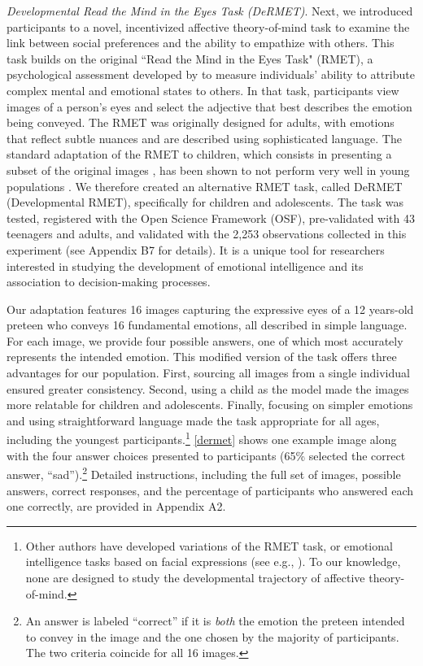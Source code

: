 \documentclass[11pt]{article}
\begin{document}
\emph{Developmental Read the Mind in the Eyes Task (DeRMET)}. Next, we introduced participants to a novel, incentivized affective theory-of-mind task to examine the link between social preferences and the ability to empathize with others. This task builds on the original ``Read the Mind in the Eyes Task" (RMET), a psychological assessment developed by  \citet{baron1997another} to measure individuals' ability to attribute complex mental and emotional states to others. In that task, participants view images of a person’s eyes and select the adjective that best describes the emotion being conveyed. The RMET was originally designed for adults, with emotions that reflect subtle nuances and are described using sophisticated language. The standard adaptation of the RMET to children, which consists in presenting a subset of the original images \citep{baron2001studies}, has been shown to not perform very well in young populations \citep{van2017comparison}.
We therefore created an alternative RMET task, called DeRMET (Developmental RMET), specifically for children and adolescents. The task was tested, registered with the Open Science Framework (OSF), pre-validated with 43 teenagers and adults, and validated with the 2,253 observations collected in this experiment (see Appendix B7 for details). It is a unique tool for researchers interested in studying the development of emotional intelligence and its association to decision-making processes. 
 
 Our adaptation features 16 images capturing the expressive eyes of a 12 years-old preteen who conveys 16 fundamental emotions, all described in simple language. For each image, we provide four possible answers, one of which most accurately represents the intended emotion. This modified version of the task offers three advantages for our population. First, sourcing all images from a single individual ensured greater consistency. Second, using a child as the model made the images more relatable for children and adolescents. Finally, focusing on simpler emotions and using straightforward language made the task appropriate for all ages, including the youngest participants.\footnote{Other authors have developed variations of the RMET task, or emotional intelligence tasks based on facial expressions (see e.g., \citet{mattek2021100, pahnke2020reading}). To our knowledge, none are designed to study the developmental trajectory of affective theory-of-mind.} \autoref{dermet} shows one example image along with the four answer choices presented to participants (65\% selected the correct answer, ``sad”).\footnote{An answer is labeled ``correct” if it is \emph{both\/} the emotion the preteen intended to convey in the image and the one chosen by the majority of participants. The two criteria coincide for all 16 images.} Detailed instructions, including the full set of images, possible answers, correct responses, and the percentage of participants who answered each one correctly, are provided in Appendix A2.
  
\end{document}
